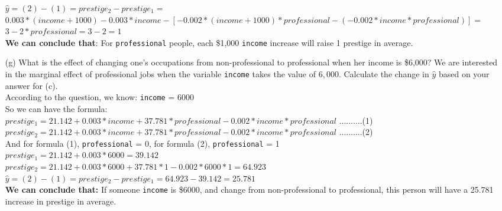\documentclass[12pt,letterpaper]{article}
\begin{document}
\begin{enumerate}
	$\hat{y} = (2) - (1) = prestige_2 - prestige_1 = $ \\ 
	$0.003 * (income + 1000) - 0.003 * income  - [-0.002 * (income + 1000) * professional - (-0.002 * income * professional)] = $ \\
	$ 3 - 2 * professional = 3 - 2 = 1$\\
	
	\textbf{We can conclude that}: For \texttt{professional} people, each \$1,000 \texttt{income} increase will raise 1 prestige in average.
	
	\vspace{.5cm}
	
	\item [(g)]
	What is the effect of changing one's occupations from non-professional to professional when her income is \$6,000? We are interested in the marginal effect of professional jobs when the variable \texttt{income} takes the value of $6,000$. Calculate the change in $\hat{y}$ based on your answer for (c).\\
	
	According to the question, we know: \texttt{income} = 6000 \\
	So we can have the formula:\\
	$prestige_1 =  21.142 + 0.003 * income + 37.781 * professional - 0.002 * income * professional $ ..........(1)\\
	$prestige_2 =  21.142 + 0.003 * income + 37.781 * professional - 0.002 * income * professional $ ..........(2)\\
	
	And for formula (1), \texttt{professional} = 0, for formula (2), \texttt{professional} = 1 \\
	$prestige_1 = 21.142 + 0.003 * 6000 = 39.142$ \\
	$prestige_2 = 21.142 + 0.003 * 6000 + 37.781 * 1 - 0.002 * 6000 * 1 = 64.923$ \\
	
	$\hat{y} = (2) - (1) = prestige_2 - prestige_1 = 64.923 - 39.142 = 25.781$ \\ 
	
	\textbf{We can conclude that:} If someone \texttt{income} is \$6000, and change from non-professional to professional, this person will have a 25.781 increase in prestige in average.

	
\end{enumerate}

\newpage
\end{document}
